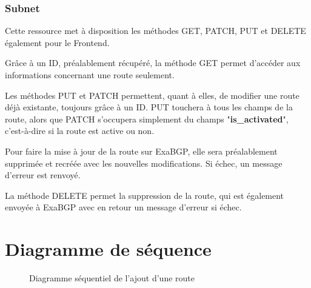 \subsubsection{Subnet}
Cette ressource met à disposition les méthodes GET, PATCH, PUT et DELETE également pour le Frontend.

Grâce à un ID, préalablement récupéré, la méthode GET permet d'accéder aux informations concernant une route seulement.

Les méthodes PUT et PATCH permettent, quant à elles, de modifier une route déjà existante, toujours grâce à un ID.
PUT touchera à tous les champs de la route, alors que PATCH s'occupera simplement du champs "\textbf{is\_activated}", c'est-à-dire si la route est active ou non.

Pour faire la mise à jour de la route sur ExaBGP, elle sera préalablement supprimée et recréée avec les nouvelles modifications. Si échec, un message d'erreur est renvoyé.

La méthode DELETE permet la suppression de la route, qui est également envoyée à ExaBGP avec en retour un message d'erreur si échec.

\section{Diagramme de séquence}
\begin{figure}[H]
\caption{Diagramme séquentiel de l'ajout d'une route}
\label{fig:diagram_seq}
\end{figure}